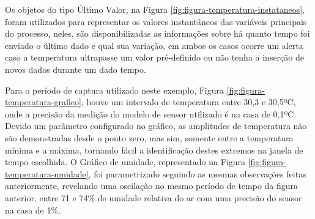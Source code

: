         \begin{figure}[!h]
    	\end{figure}
    	
Os objetos do tipo Último Valor, na Figura \ref{fig:figura-temperatura-instataneos}, foram utilizados para representar os valores instantâneos das variáveis principais do processo, neles, são disponibilizadas as informações sobre há quanto tempo foi enviado o último dado e qual sua variação, em ambos os casos ocorre um alerta caso a temperatura ultrapasse um valor pré-definido ou não tenha a inserção de novos dados durante um dado tempo.

        \begin{figure}[!h]
    	\end{figure}
    	
Para o período de captura utilizado neste exemplo, Figura \ref{fig:figura-temperatura-grafico}, houve um intervalo de temperatura entre 30,3 e 30,5ºC, onde a precisão da medição do modelo de sensor utilizado é na casa de 0,1ºC. Devido um parâmetro configurado no gráfico, as amplitudes de temperatura não são demonstradas desde o ponto zero, mas sim, somente entre a temperatura mínima e a máxima, tornando fácil a identificação destes extremos na janela de tempo escolhida. O Gráfico de umidade, representado na Figura \ref{fig:figura-temperatura-umidade}, foi parametrizado seguindo as mesmas observações feitas anteriormente, revelando uma oscilação no mesmo período de tempo da figura anterior, entre 71 e 74\% de umidade relativa do ar com uma precisão do sensor na casa de 1\%.


